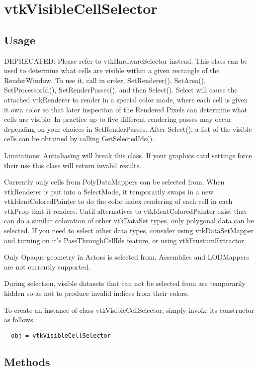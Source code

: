 \section{vtkVisibleCellSelector}

\subsection{Usage}

 DEPRECATED: Please refer to vtkHardwareSelector instead.
 This class can be used to determine what cells are visible within a given
 rectangle of the RenderWindow. To use it, call in order, SetRenderer(), 
 SetArea(), SetProcessorId(), SetRenderPasses(), and then Select(). Select 
 will cause the attached vtkRenderer to render in a special color mode, 
 where each cell is given it own color so that later inspection of the 
 Rendered Pixels can determine what cells are visible. In practice up to 
 five different rendering passes may occur depending on your choices in 
 SetRenderPasses. After Select(), a list of the visible cells can be 
 obtained by calling GetSelectedIds().

 Limitations:
 Antialiasing will break this class. If your graphics card settings force
 their use this class will return invalid results.

 Currently only cells from PolyDataMappers can be selected from. When 
 vtkRenderer is put into a SelectMode, it temporarily swaps in a new 
 vtkIdentColoredPainter to do the color index rendering of each cell in 
 each vtkProp that it renders. Until alternatives to vtkIdentColoredPainter
 exist that can do a similar coloration of other vtkDataSet types, only
 polygonal data can be selected. If you need to select other data types,
 consider using vtkDataSetMapper and turning on it's PassThroughCellIds 
 feature, or using vtkFrustumExtractor.

 Only Opaque geometry in Actors is selected from. Assemblies and LODMappers 
 are not currently supported. 

 During selection, visible datasets that can not be selected from are
 temporarily hidden so as not to produce invalid indices from their colors.


To create an instance of class vtkVisibleCellSelector, simply
invoke its constructor as follows
\begin{verbatim}
  obj = vtkVisibleCellSelector
\end{verbatim}
\subsection{Methods}

